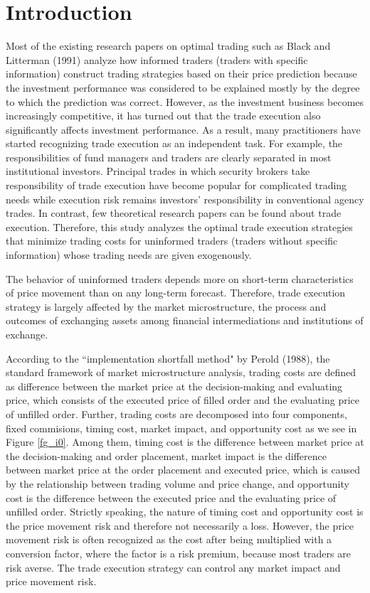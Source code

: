 
\chapter{Introduction}

Most of the existing research papers on optimal trading such as Black and Litterman (1991) analyze how informed traders (traders with specific information) construct trading strategies based on their price prediction because the investment performance was considered to be explained mostly by the degree to which the prediction was correct.  However, as the investment business becomes increasingly competitive, it has turned out that the trade execution also significantly affects investment performance.  As a result, many practitioners have started recognizing trade execution as an independent task.  For example, the responsibilities of fund managers and traders are clearly separated in most institutional investors. Principal trades in which security brokers take responsibility of trade execution have become popular for complicated trading needs while execution risk remains investors' responsibility in conventional agency trades.  In contrast, few theoretical research papers can be found about trade execution.  Therefore, this study analyzes the optimal trade execution strategies that minimize trading costs for uninformed traders (traders without specific information) whose trading needs are given exogenously. 

The behavior of uninformed traders depends more on short-term characteristics of price movement than on any long-term forecast.  Therefore, trade execution strategy is largely affected by the market microstructure, the process and outcomes of exchanging assets among financial intermediations and institutions of exchange.  

According to the ``implementation shortfall method" by Perold (1988), the standard framework of market microstructure analysis, trading costs are defined as difference between the market price at the decision-making and evaluating price, which consists of the executed price of filled order and the evaluating price of unfilled order.  Further, trading costs are decomposed into four components, fixed commisions, timing cost, market impact, and opportunity cost as we see in Figure \ref{fg_i0}.  Among them, timing cost is the difference between market price at the decision-making and order placement, market impact is the difference between market price at the order placement and executed price, which is caused by the relationship between trading volume and price change, and opportunity cost is the difference between the executed price and the evaluating price of unfilled order.  Strictly speaking, the nature of timing cost and opportunity cost is the price movement risk and therefore not necessarily a loss.  However, the price movement risk is often recognized as the cost after being multiplied with a conversion factor, where the factor is a risk premium, because most traders are risk averse.  The trade execution strategy can control any market impact and price movement risk.


